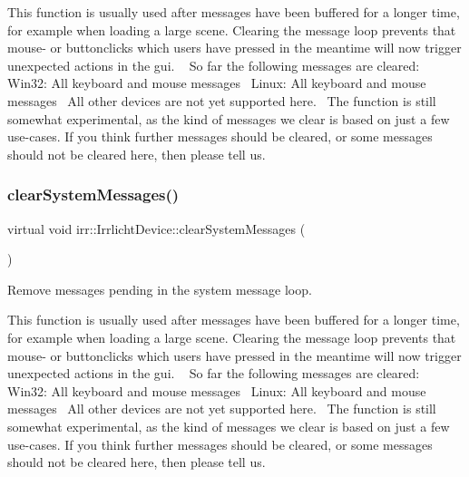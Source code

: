 This function is usually used after messages have been buffered for a longer time, for example when loading a large scene. Clearing the message loop prevents that mouse-\/ or buttonclicks which users have pressed in the meantime will now trigger unexpected actions in the gui. ~\newline
 So far the following messages are cleared\+:~\newline
 Win32\+: All keyboard and mouse messages~\newline
 Linux\+: All keyboard and mouse messages~\newline
 All other devices are not yet supported here.~\newline
 The function is still somewhat experimental, as the kind of messages we clear is based on just a few use-\/cases. If you think further messages should be cleared, or some messages should not be cleared here, then please tell us. \mbox{\label{classirr_1_1IrrlichtDevice_aa10c6151a267d8a1500d5dc7b44425dd}} 
\subsubsection{\texorpdfstring{clear\+System\+Messages()}{clearSystemMessages()}\hspace{0.1cm}{\footnotesize\ttfamily [2/2]}}
{\footnotesize\ttfamily virtual void irr\+::\+Irrlicht\+Device\+::clear\+System\+Messages (\begin{DoxyParamCaption}{ }\end{DoxyParamCaption})\hspace{0.3cm}{\ttfamily [pure virtual]}}



Remove messages pending in the system message loop. 

This function is usually used after messages have been buffered for a longer time, for example when loading a large scene. Clearing the message loop prevents that mouse-\/ or buttonclicks which users have pressed in the meantime will now trigger unexpected actions in the gui. ~\newline
 So far the following messages are cleared\+:~\newline
 Win32\+: All keyboard and mouse messages~\newline
 Linux\+: All keyboard and mouse messages~\newline
 All other devices are not yet supported here.~\newline
 The function is still somewhat experimental, as the kind of messages we clear is based on just a few use-\/cases. If you think further messages should be cleared, or some messages should not be cleared here, then please tell us. \mbox{\label{classirr_1_1IrrlichtDevice_a08c97937e0f60f98d443b397a7c60e18}} 
